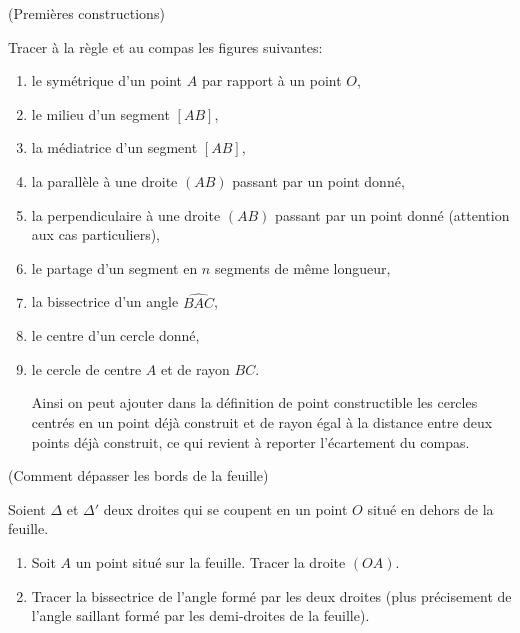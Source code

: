 \documentclass[a4paper,11pt,reqno]{amsart}
\begin{document}
\begin{exo} (Premières constructions)

  Tracer à la règle et au compas les figures suivantes:
  \begin{enumerate}
    \item le symétrique d'un point $A$ par rapport à un point $O$,
    \item le milieu d'un segment $[AB]$,
    \item la médiatrice d'un segment $[AB]$,
    \item la parallèle à une droite $(AB)$ passant par un point donné,
    \item la perpendiculaire à une droite $(AB)$ passant par un point donné (attention aux cas particuliers),
    \item le partage d'un segment en $n$ segments de même longueur,
    \item la bissectrice d'un angle $\widehat{BAC}$,
    \item le centre d'un cercle donné,
    \item le cercle de centre $A$ et de rayon $BC$.
    \begin{convention}
      Ainsi on peut ajouter dans la définition de point constructible les cercles centrés en un point déjà construit et de rayon égal à la distance entre deux points déjà construit, ce qui revient à reporter l'écartement du compas.
    \end{convention}
  \end{enumerate}
\end{exo}


\begin{exo}  (Comment dépasser les bords de la feuille)

  Soient $\Delta$ et $\Delta'$ deux droites qui se coupent en un point $O$ situé en dehors de la feuille.
  \begin{enumerate}
    \item Soit $A$ un point situé sur la feuille. Tracer la droite $(OA)$.
    \item Tracer la bissectrice de l'angle formé par les deux droites (plus précisement de l'angle saillant formé par les demi-droites de la feuille).
  \end{enumerate}

\end{exo}
\end{document}
